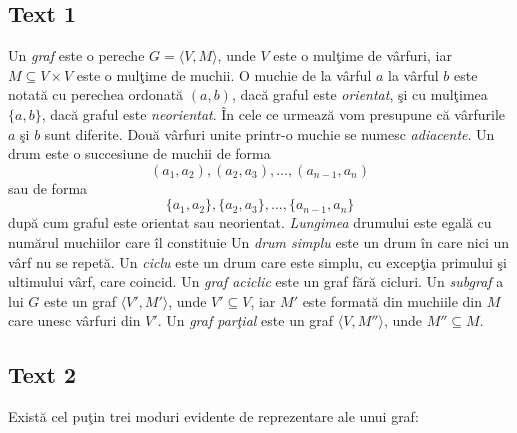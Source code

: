 \documentclass{article}
\begin{document}
\subsection*{Text 1}

Un \textit{graf} este o pereche $G = \langle V,M \rangle$, unde $V$ este o mulţime de vârfuri, iar $M \subseteq V \times V$ este o mulţime de muchii. O muchie de la vârful $a$ la vârful $b$ este notată cu perechea ordonată $(a, b)$, dacă graful este \textit{orientat}, şi cu mulţimea $\{a, b\}$, dacă graful este \textit{neorientat}. În cele ce urmează vom presupune că vârfurile $a$ şi $b$ sunt diferite. Două vârfuri unite printr-o muchie se numesc \textit{adiacente}. Un drum este o succesiune de muchii de forma $$ (a_1, a_2), (a_2, a_3), \dots, (a_{n-1}, a_n) $$ sau de forma $$ \{a_1, a_2\}, \{a_2, a_3\}, \dots, \{a_{n-1}, a_n\} $$ după cum graful este orientat sau neorientat. \textit{Lungimea} drumului este egală cu numărul muchiilor care îl constituie Un \textit{drum simplu} este un drum în care nici un vârf nu se repetă. Un \textit{ciclu} este un drum care este simplu, cu excepţia primului şi ultimului vârf, care coincid. Un \textit{graf aciclic} este un graf fără cicluri. Un \textit{subgraf} a lui $G$ este un graf $\langle V', M' \rangle$, unde $V' \subseteq V$, iar $M'$ este formată din muchiile din $M$ care unesc vârfuri din $V'$. Un \textit{graf parţial} este un graf $\langle V, M'' \rangle$, unde $M'' \subseteq M$.

\subsection*{Text 2}

Există cel puţin trei moduri evidente de reprezentare ale unui graf:
\end{document}

